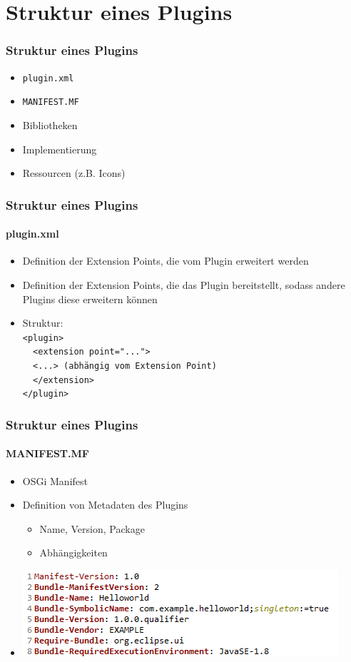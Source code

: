 {\section{Struktur eines Plugins}
\begin{frame}
  \frametitle{Struktur eines Plugins}
  \begin{itemize}
  \item \texttt{plugin.xml}
  \item \texttt{MANIFEST.MF}
  \item Bibliotheken
  \item Implementierung
  \item Ressourcen (z.B. Icons)
  \end{itemize}
\end{frame}

\begin{frame}
  \frametitle{Struktur eines Plugins}
  \framesubtitle{plugin.xml}
  \begin{itemize}
  \item Definition der Extension Points, die vom Plugin erweitert werden
  \item Definition der Extension Points, die das Plugin bereitstellt, sodass andere Plugins diese erweitern können
  \item Struktur: \\
  \texttt{<plugin>\\ \ \ <extension point="...">\\ \ \ <...> (abhängig vom Extension Point)\\ \ \ </extension>\\ </plugin>}
  \end{itemize}
\end{frame}

\begin{frame}
  \frametitle{Struktur eines Plugins}
  \framesubtitle{MANIFEST.MF}
  \begin{itemize}
    \item OSGi Manifest
    \item Definition von Metadaten des Plugins
    \begin{itemize}
      \item Name, Version, Package
      \item Abhängigkeiten
    \end{itemize}
	\item \begin{minipage}{\linewidth}
		\includegraphics[scale=0.8]{images/manifest.png}
      \end{minipage}	 
  \end{itemize}
\end{frame}

}

